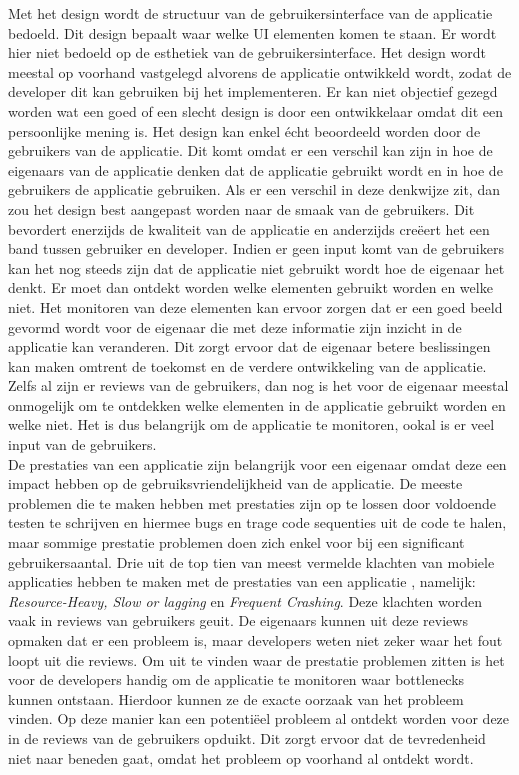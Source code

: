 Met het design wordt de structuur van de gebruikersinterface van de applicatie bedoeld. Dit design bepaalt waar welke UI elementen komen te staan. Er wordt hier niet bedoeld op de esthetiek van de gebruikersinterface.
Het design wordt meestal op voorhand vastgelegd alvorens de applicatie ontwikkeld wordt, zodat de developer dit kan gebruiken bij het implementeren. Er kan niet objectief gezegd worden wat een goed of een slecht design is door een ontwikkelaar omdat dit een persoonlijke mening is. Het design kan enkel \'echt beoordeeld worden door de gebruikers van de applicatie. Dit komt omdat er een verschil kan zijn in hoe de eigenaars van de applicatie denken dat de applicatie gebruikt wordt en in hoe de gebruikers de applicatie gebruiken. Als er een verschil in deze denkwijze zit, dan zou het design best aangepast worden naar de smaak van de gebruikers. Dit bevordert enerzijds de kwaliteit van de applicatie en anderzijds cre\"eert het een band tussen gebruiker en developer. Indien er geen input komt van de gebruikers kan het nog steeds zijn dat de applicatie niet gebruikt wordt hoe de eigenaar het denkt. Er moet dan ontdekt worden welke elementen gebruikt worden en welke niet. Het monitoren van deze elementen kan ervoor zorgen dat er een goed beeld gevormd wordt voor de eigenaar die met deze informatie zijn inzicht in de applicatie kan veranderen. Dit zorgt ervoor dat de eigenaar betere beslissingen kan maken omtrent de toekomst en de verdere ontwikkeling van de applicatie. Zelfs al zijn er reviews van de gebruikers, dan nog is het voor de eigenaar meestal onmogelijk om te ontdekken welke elementen in de applicatie gebruikt worden en welke niet. Het is dus belangrijk om de applicatie te monitoren, ookal is er veel input van de gebruikers. \\


De prestaties van een applicatie zijn belangrijk voor een eigenaar omdat deze een impact hebben op de gebruiksvriendelijkheid van de applicatie. De meeste problemen die te maken hebben met prestaties zijn op te lossen door voldoende testen te schrijven en hiermee bugs en trage code sequenties uit de code te halen, maar sommige prestatie problemen doen zich enkel voor bij een significant gebruikersaantal. Drie uit de top tien van meest vermelde klachten van mobiele applicaties hebben te maken met de prestaties van een applicatie \cite{AppSucks}, namelijk: \textit{Resource-Heavy, Slow or lagging} en \textit{Frequent Crashing}. Deze klachten worden vaak in reviews van gebruikers geuit. De eigenaars kunnen uit deze reviews opmaken dat er een probleem is, maar developers weten niet zeker waar het fout loopt uit die reviews. Om uit te vinden waar de prestatie problemen zitten is het voor de developers handig om de applicatie te monitoren waar bottlenecks kunnen ontstaan. Hierdoor kunnen ze de exacte oorzaak van het probleem vinden. Op deze manier kan een potenti\"eel probleem al ontdekt worden voor deze in de reviews van de gebruikers opduikt. Dit zorgt ervoor dat de tevredenheid niet naar beneden gaat, omdat het probleem op voorhand al ontdekt wordt. \\



